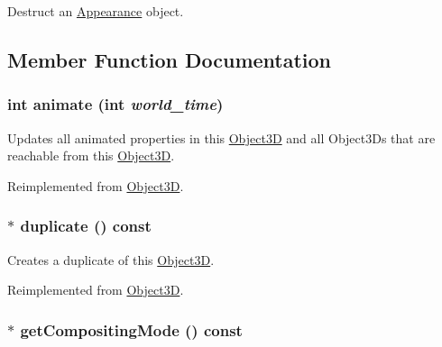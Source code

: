 Destruct an \hyperlink{classm3g_1_1Appearance}{Appearance} object. 

\subsection{Member Function Documentation}
\hypertarget{classm3g_1_1Appearance_8aad1ceab4c2a03609c8a42324ce484d}{
\subsubsection[{animate}]{\setlength{\rightskip}{0pt plus 5cm}int animate (int {\em world\_\-time})}}
\label{classm3g_1_1Appearance_8aad1ceab4c2a03609c8a42324ce484d}


Updates all animated properties in this \hyperlink{classm3g_1_1Object3D}{Object3D} and all Object3Ds that are reachable from this \hyperlink{classm3g_1_1Object3D}{Object3D}. 

Reimplemented from \hyperlink{classm3g_1_1Object3D_8aad1ceab4c2a03609c8a42324ce484d}{Object3D}.\hypertarget{classm3g_1_1Appearance_ceaab703eb45cba7cf8705bc3a087127}{
\subsubsection[{duplicate}]{ $\ast$ duplicate () const}}
\label{classm3g_1_1Appearance_ceaab703eb45cba7cf8705bc3a087127}


Creates a duplicate of this \hyperlink{classm3g_1_1Object3D}{Object3D}. 

Reimplemented from \hyperlink{classm3g_1_1Object3D_a25110dac934f867b83b73ad4741a0f4}{Object3D}.\hypertarget{classm3g_1_1Appearance_e4045934febb56891c15e14486b239a8}{
\subsubsection[{getCompositingMode}]{ $\ast$ getCompositingMode () const}}
\label{classm3g_1_1Appearance_e4045934febb56891c15e14486b239a8}


